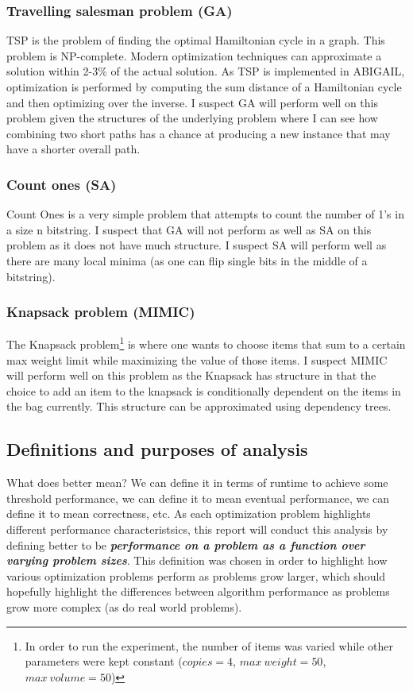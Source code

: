 \documentclass[12pt]{article}
\begin{document}
\subsubsection{Travelling salesman problem (GA)}
TSP is the problem of finding the optimal Hamiltonian cycle in a graph. This problem is NP-complete. Modern optimization techniques can approximate a solution within 2-3\% of the actual solution. As TSP is implemented in ABIGAIL, optimization is performed by computing the sum distance of a Hamiltonian cycle and then optimizing over the inverse. I suspect GA will perform well on this problem given the structures of the underlying problem where I can see how combining two short paths has a chance at producing a new instance that may have a shorter overall path.


\subsubsection{Count ones (SA)}
Count Ones is a very simple problem that attempts to count the number of 1's in a size n bitstring. I suspect that GA will not perform as well as SA on this problem as it does not have much structure. I suspect SA will perform well as there are many local minima (as one can flip single bits in the middle of a bitstring).

\subsubsection{Knapsack problem (MIMIC)}
The Knapsack problem\footnote{In order to run the experiment, the number of items was varied while other parameters were kept constant ($copies = 4$, $max\ weight = 50$, $max\ volume = 50$)} is where one wants to choose items that sum to a certain max weight limit while maximizing the value of those items. I suspect MIMIC will perform well on this problem as the Knapsack has structure in that the choice to add an item to the knapsack is conditionally dependent on the items in the bag currently. This structure can be approximated using dependency trees.

\subsection{Definitions and purposes of analysis}
What does better mean? We can define it in terms of runtime to achieve some threshold performance, we can define it to mean eventual performance, we can define it to mean correctness, etc. As each optimization problem highlights different performance characteristsics, this report will conduct this analysis by defining better to be \textbf{\textit{performance on a problem as a function over varying problem sizes}}. This definition was chosen in order to highlight how various optimization problems perform as problems grow larger, which should hopefully highlight the differences between algorithm performance as problems grow more complex (as do real world problems).
\end{document}
